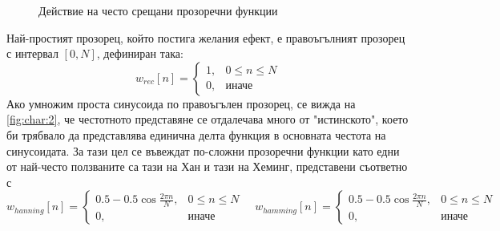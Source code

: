 \documentclass[main.tex]{subfiles}
\begin{document}
    \begin{figure}[H]%
        \centering
            \hspace{2cm}
            \vfill
            \hspace{2cm}
            \vfill
            \hspace{2cm}
        \caption{Действие на често срещани прозоречни функции}%
        \label{fig:char:2}
    \end{figure}

    Най-простият прозорец, който постига желания ефект, е правоъгълният прозорец с интервал $[0, N]$, дефиниран така: 
   \[
    w_{rec}[n] = \begin{cases} 
        1, & 0\leq n \leq N \\
        0, & \text{иначе}
    \end{cases}
    \]
    Ако умножим проста синусоида по правоъгълен прозорец, се вижда на \autoref{fig:char:2}, че честотното представяне се отдалечава много от "истинското", което би трябвало да представлява единична делта функция в основната честота на синусоидата. За тази цел се въвеждат по-сложни прозоречни функции като едни от най-често ползваните са тази на Хан и тази на Хеминг, представени съответно с
    \[
    w_{hanning}[n] = \begin{cases} 
        0.5 - 0.5 \cos{\frac{2\pi n}{N}}, & 0\leq n \leq N \\
        0, & \text{иначе}
    \end{cases}\quad w_{hamming}[n] = \begin{cases} 
        0.5 - 0.5 \cos{\frac{2\pi n}{N}}, & 0\leq n \leq N \\
        0, & \text{иначе}
    \end{cases}
    \]
\end{document}
